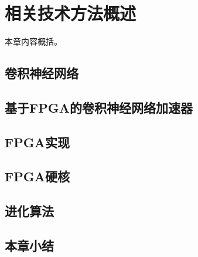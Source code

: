 \chapter{相关技术方法概述}
本章内容概括。




\section{卷积神经网络}



\section{基于FPGA的卷积神经网络加速器}




\section{FPGA实现}



\section{FPGA硬核}



\section{进化算法}


\section{本章小结}





































































